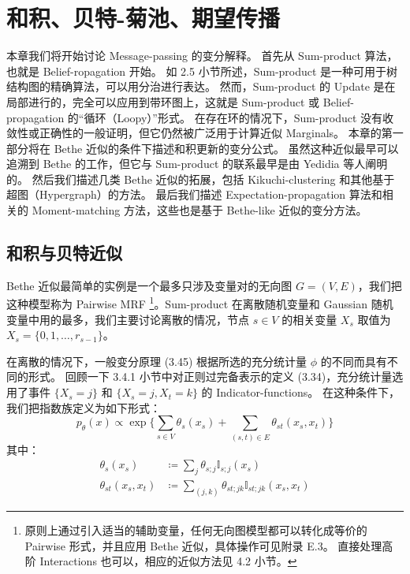 \chapter{和积、贝特-菊池、期望传播}

本章我们将开始讨论 Message-passing 的变分解释。
首先从 Sum-product 算法，也就是 Belief-ropagation 开始。
如 2.5 小节所述，Sum-product 是一种可用于树结构图的精确算法，可以用分治进行表达。
然而，Sum-product 的 Update 是在局部进行的，完全可以应用到带环图上，这就是 Sum-product 或 Belief-propagation 的“循环（Loopy）”形式。
在存在环的情况下，Sum-product 没有收敛性或正确性的一般证明，但它仍然被广泛用于计算近似 Marginals。
本章的第一部分将在 Bethe 近似的条件下描述和积更新的变分公式。
虽然这种近似最早可以追溯到 Bethe 的工作，但它与 Sum-product 的联系最早是由 Yedidia 等人阐明的。
然后我们描述几类 Bethe 近似的拓展，包括 Kikuchi-clustering 和其他基于超图（Hypergraph）的方法。
最后我们描述 Expectation-propagation 算法和相关的 Moment-matching 方法，这些也是基于 Bethe-like 近似的变分方法。

\section{和积与贝特近似}

Bethe 近似最简单的实例是一个最多只涉及变量对的无向图 $G = (V, E)$，我们把这种模型称为 Pairwise MRF \footnote{
    原则上通过引入适当的辅助变量，任何无向图模型都可以转化成等价的 Pairwise 形式，并且应用 Bethe 近似，具体操作可见附录 E.3。
    直接处理高阶 Interactions 也可以，相应的近似方法见 4.2 小节。
}。Sum-product 在离散随机变量和 Gaussian 随机变量中用的最多，我们主要讨论离散的情况，节点 $s \in V$ 的相关变量 $X_s$ 取值为 $X_s = \{0, 1, \dots, r_{s-1}\}$。

在离散的情况下，一般变分原理 (3.45) 根据所选的充分统计量 $\phi$ 的不同而具有不同的形式。
回顾一下 3.4.1 小节中对正则过完备表示的定义 (3.34)，充分统计量选用了事件 $\{X_s = j\}$ 和 $\{X_s = j, X_t = k\}$ 的 Indicator-functions。
在这种条件下，我们把指数族定义为如下形式：
\begin{equation}
    p_{\theta}(x) \propto \exp\{\sum_{s \in V}\theta_s(x_s) + \sum_{(s, t) \in E}\theta_{st}(x_s, x_t)\}
\end{equation}
其中：
\begin{subequations}
\begin{align}
    \theta_s(x_s) &\coloneqq \sum_{j}\theta_{s;j}\mathbb{I}_{s;j}(x_s) \\
    \theta_{st}(x_s, x_t) &\coloneqq \sum_{(j, k)}\theta_{st;jk}\mathbb{I}_{st;jk}(x_s, x_t)
\end{align}
\end{subequations}

